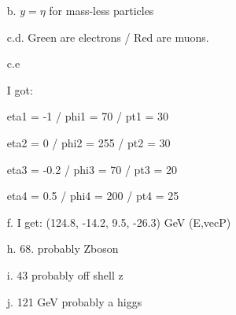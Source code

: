 {\begin{itemize}
{\be
E \rightarrow E \gamma - \beta \gamma p_z
\ee
\be
p_z \rightarrow p_z \gamma - \beta \gamma E
\ee

So,

\begin{align*}
y \rightarrow \frac{1}{2} \log \frac{(E \gamma - \beta \gamma p_z) + (p_z \gamma - \beta \gamma E)}{(E \gamma - \beta \gamma p_z) -(p_z \gamma - \beta \gamma E)} \\ 
  = \frac{1}{2} \log \frac{\gamma - \beta \gamma}{\gamma + \beta \gamma}\frac{E+p_z}{E - p_z} = \frac{1}{2} \log \frac{E+p_z}{E - p_z} + \frac{1}{2} \log \frac{\gamma - \beta \gamma}{\gamma + \beta \gamma}\\
  = y + \frac{1}{2} \log \frac{\cosh \eta - \sinh \eta}{\cosh + \sinh \eta} = y + \frac{1}{2} \log \frac{e^{-\eta}} {e^{+\eta}}\\
  = y + \frac{1}{2} \log e^{-2\eta} = y - \eta
 \end{align*}

}
\item[b.]{
$y = \eta $ for mass-less particles
}
\item[c.d.]{
Green are electrons / Red are muons.
}
\item[c.e]{
I got:

eta1 = -1  /
phi1 = 70 /
pt1  = 30 

eta2 = 0  /
phi2 = 255 /
pt2  = 30 

eta3 = -0.2 / 
phi3 = 70  /
pt3  = 20

eta4 = 0.5 / 
phi4 = 200 /
pt4  = 25 

}
\item[f.]{
I get: (124.8, -14.2, 9.5, -26.3) GeV (E,vec{P})
}
\item[h.]{68. probably Zboson}
\item[i.]{43 probably off shell z}
\item[j.]{121 GeV probably a higgs}





\end{itemize}




}

